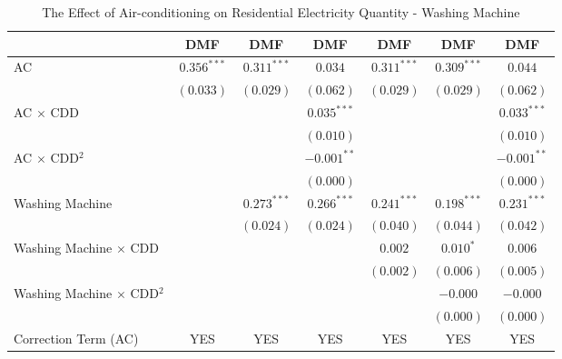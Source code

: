 
\begin{table}[htbp]
\caption{The Effect of Air-conditioning on Residential Electricity Quantity - Washing Machine}
\begin{center}
\begin{tabular}{l c c c c c c}
\hline
 & DMF & DMF & DMF & DMF & DMF & DMF \\
\hline
AC                                & $0.356^{***}$ & $0.311^{***}$ & $0.034$       & $0.311^{***}$ & $0.309^{***}$ & $0.044$       \\
                                  & $(0.033)$     & $(0.029)$     & $(0.062)$     & $(0.029)$     & $(0.029)$     & $(0.062)$     \\
AC $\times$ CDD                   &               &               & $0.035^{***}$ &               &               & $0.033^{***}$ \\
                                  &               &               & $(0.010)$     &               &               & $(0.010)$     \\
AC $\times$ CDD$^2$               &               &               & $-0.001^{**}$ &               &               & $-0.001^{**}$ \\
                                  &               &               & $(0.000)$     &               &               & $(0.000)$     \\
Washing Machine                   &               & $0.273^{***}$ & $0.266^{***}$ & $0.241^{***}$ & $0.198^{***}$ & $0.231^{***}$ \\
                                  &               & $(0.024)$     & $(0.024)$     & $(0.040)$     & $(0.044)$     & $(0.042)$     \\
Washing Machine $\times$ CDD      &               &               &               & $0.002$       & $0.010^{*}$   & $0.006$       \\
                                  &               &               &               & $(0.002)$     & $(0.006)$     & $(0.005)$     \\
Washing Machine $\times$ CDD$^2$  &               &               &               &               & $-0.000$      & $-0.000$      \\
                                  &               &               &               &               & $(0.000)$     & $(0.000)$     \\
\hline
Correction Term (AC)              & YES           & YES           & YES           & YES           & YES           & YES           \\

\end{tabular}
\end{center}
\end{table}
